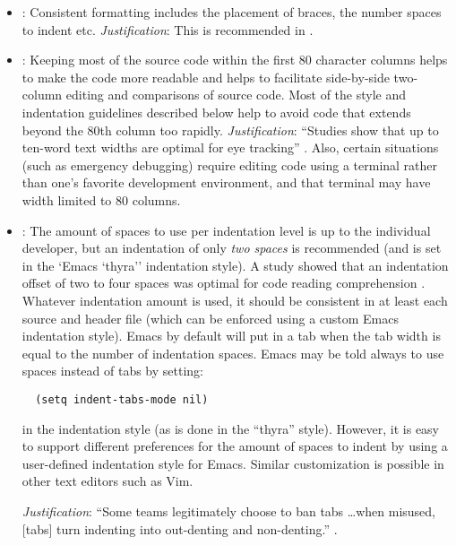 \begin{itemize}

\item\FSCConsistentInFile: Consistent formatting includes the
  placement of braces, the number spaces to indent etc.
  {}\textit{Justification}: This is recommended in \cite[Item
  0]{C++CodingStandards05}.

\item\FSCEightyCharWide: Keeping most of the source code within the
  first 80 character columns helps to make the code more readable and
  helps to facilitate side-by-side two-column editing and comparisons
  of source code.  Most of the style and indentation guidelines
  described below help to avoid code that extends beyond the 80th
  column too rapidly. \textit{Justification}: ``Studies show that up
  to ten-word text widths are optimal for eye tracking'' \cite[Item
  0]{C++CodingStandards05}.  Also, certain situations (such as
  emergency debugging) require editing code using a terminal rather
  than one's favorite development environment, and that terminal may
  have width limited to 80 columns.

\item\FSCIndentSpaces: The amount of spaces to use per indentation
  level is up to the individual developer, but an indentation of only
  \textit{two spaces} is recommended (and is set in the `Emacs
  `thyra'' indentation style).  A study showed that an indentation
  offset of two to four spaces was optimal for code reading
  comprehension \cite[Section 31.2]{CodeComplete2nd04}.  Whatever
  indentation amount is used, it should be consistent in at least each
  source and header file \cite[Item 0]{C++CodingStandards05} (which
  can be enforced using a custom Emacs indentation style).  Emacs by
  default will put in a tab when the tab width is equal to the number
  of indentation spaces.  Emacs may be told always to use spaces
  instead of tabs by setting:

{\small\begin{verbatim}
  (setq indent-tabs-mode nil)
\end{verbatim}}

  in the indentation style (as is done in the ``thyra'' style).
  However, it is easy to support different preferences for the amount
  of spaces to indent by using a user-defined indentation style for
  Emacs.  Similar customization is possible in other text editors such
  as Vim.

  \textit{Justification}: ``Some teams legitimately choose to ban tabs
  \dots when misused, [tabs] turn indenting into out-denting and
  non-denting.''  \cite[Item 0]{C++CodingStandards05}.



\end{itemize}
